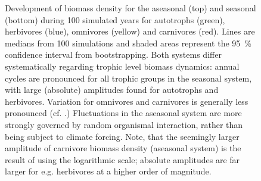 \begin{figure}[h!]
\centering

\caption[Log-body mass density time series for \textit{exp. 1} in both systems]{Development of biomass density for the aseasonal (top) and seasonal (bottom) during 100 simulated years for autotrophs (green), herbivores (blue), omnivores (yellow) and carnivores (red). Lines are medians from 100 simulations and shaded areas represent the 95~\% confidence interval from bootstrapping. Both systems differ systematically regarding trophic level biomass dynamics: annual cycles are pronounced for all trophic groups in the seasonal system, with large (absolute) amplitudes found for autotrophs and herbivores. Variation for omnivores and carnivores is generally less pronounced (cf. .) Fluctuations in the aseasonal system are more strongly governed by random organismal interaction, rather than being subject to climate forcing. Note, that the seemingly larger amplitude of carnivore biomass density (aseasonal system) is the result of using the logarithmic scale; absolute amplitudes are far larger for e.g. herbivores at a higher order of magnitude. }
\label{fig:chap:res:ts:expno1}
\end{figure}
